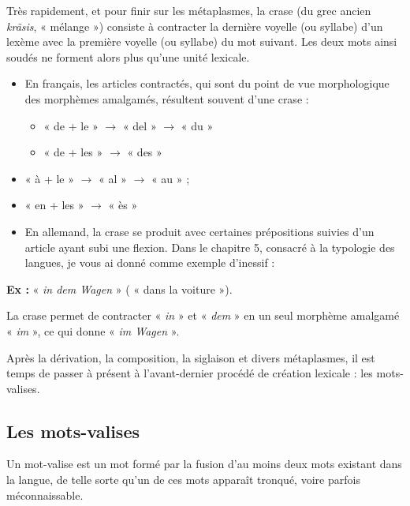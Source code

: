 Très rapidement, et pour finir sur les métaplasmes, la crase (du grec ancien \textit{krãsis}, « mélange ») consiste à contracter la dernière voyelle (ou syllabe) d’un lexème avec la première voyelle (ou syllabe) du mot suivant. Les deux mots ainsi soudés ne forment alors plus qu’une unité lexicale.
\begin{itemize}
\item En français, les articles contractés, qui sont du point de vue morphologique des morphèmes amalgamés, résultent souvent d’une crase :
\begin{itemize}[label=\textbullet]
\item « de + le » $\rightarrow$ « del » $\rightarrow$ « du »
\item « de + les » $\rightarrow$ « des »
\end{itemize}
\end{itemize}
\begin{itemize}[label=\textbullet,leftmargin=3em]
\item « à + le » $\rightarrow$ « al » $\rightarrow$ « au » ;
\item « en + les » $\rightarrow$ « ès »
\end{itemize}
\begin{itemize}
\item En allemand, la crase se produit avec certaines prépositions suivies d’un article ayant subi une flexion. Dans le chapitre 5, consacré à la typologie des langues, je vous ai donné comme exemple d’inessif :
\end{itemize}
\textbf{Ex :} « \textit{in dem Wagen} » ( « dans la voiture »).

La crase permet de contracter « \textit{in} » et « \textit{dem} » en un seul morphème amalgamé « \textit{im} », ce qui donne « \textit{im Wagen} ».

Après la dérivation, la composition, la siglaison et divers métaplasmes, il est temps de passer à présent à l’avant-dernier procédé de création lexicale : les mots-valises.

\subsection{Les mots-valises}
Un mot-valise est un mot formé par la fusion d’au moins deux mots existant dans la langue, de telle sorte qu’un de ces mots apparaît tronqué, voire parfois méconnaissable.


